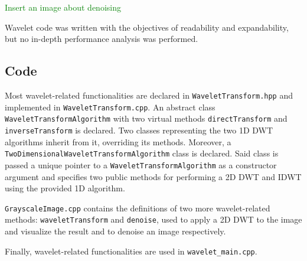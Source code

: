 \textcolor{green}{Insert an image about denoising}

Wavelet code was written with the objectives of readability and expandability, but no in-depth performance analysis was performed.

\subsection{Code}
Most wavelet-related functionalities are declared in \texttt{Wavelet\-Transform.hpp} and implemented in \texttt{Wavelet\-Transform.cpp}. An abstract class \texttt{Wavelet\-Transform\-Algorithm} with two virtual methods \texttt{direct\-Transform} and \texttt{inverse\-Transform} is declared. Two classes representing the two 1D DWT algorithms inherit from it, overriding its methods. Moreover, a \texttt{Two\-Dimensional\-Wavelet\-Transform\-Algorithm} class is declared. Said class is passed a unique pointer to a \texttt{Wavelet\-Transform\-Algorithm} as a constructor argument and specifies two public methods for performing a 2D DWT and IDWT using the provided 1D algorithm.

\texttt{Grayscale\-Image.cpp} contains the definitions of two more wavelet-related methods: \texttt{wavelet\-Transform} and \texttt{denoise}, used to apply a 2D DWT to the image and visualize the result and to denoise an image respectively.

Finally, wavelet-related functionalities are used in \texttt{wavelet\_main.cpp}.